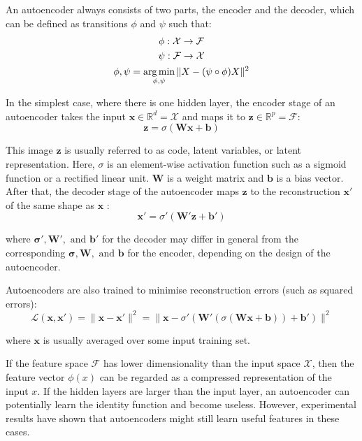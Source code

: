 \documentclass{mcmthesis}
\begin{document}
An autoencoder always consists of two parts, the encoder and the decoder, which can be defined as transitions $\phi$  and $\psi$ such that:
\begin{gather}
\phi :{\mathcal {X}}\rightarrow {\mathcal {F}} \notag\\
\psi :{\mathcal {F}}\rightarrow {\mathcal {X}} \notag\\
\phi ,\psi ={\underset {\phi ,\psi }{\operatorname {arg\,min} }}\,\|X-(\psi \circ \phi )X\|^{2}
\end{gather}

In the simplest case, where there is one hidden layer, the encoder stage of an autoencoder takes the input $\mathbf {x} \in \mathbb {R} ^{d}={\mathcal {X}}$ and maps it to $\mathbf {z} \in \mathbb {R} ^{p}={\mathcal {F}}$:
\begin{equation}
    \mathbf {z} =\sigma (\mathbf {Wx} +\mathbf {b} )
\end{equation}

This image $\mathbf {z}$  is usually referred to as code, latent variables, or latent representation. Here, $\sigma$  is an element-wise activation function such as a sigmoid function or a rectified linear unit. $\mathbf {W}$  is a weight matrix and $\mathbf {b}$  is a bias vector. After that, the decoder stage of the autoencoder maps $\mathbf {z}$  to the reconstruction $\mathbf {x'}$  of the same shape as $\mathbf {x}$ :
\begin{equation}
    \mathbf {x'} =\sigma '(\mathbf {W'z} +\mathbf {b'} )
\end{equation}


where $ \mathbf {\sigma '} ,\mathbf {W'} ,{\text{ and }}\mathbf {b'} $ for the decoder may differ in general from the corresponding $ \mathbf {\sigma } ,\mathbf {W} ,{\text{ and }}\mathbf {b} $ for the encoder, depending on the design of the autoencoder.

Autoencoders are also trained to minimise reconstruction errors (such as squared errors):
\begin{equation}
     {\mathcal {L}}(\mathbf {x} ,\mathbf {x'} )=\|\mathbf {x} -\mathbf {x'} \|^{2}=\|\mathbf {x} -\sigma '(\mathbf {W'} (\sigma (\mathbf {Wx} +\mathbf {b} ))+\mathbf {b'} )\|^{2}
\end{equation}

where $\mathbf {x}$  is usually averaged over some input training set.

If the feature space $\mathcal {F}$ has lower dimensionality than the input space $\mathcal {X}$, then the feature vector $\phi (x)$ can be regarded as a compressed representation of the input $x$. If the hidden layers are larger than the input layer, an autoencoder can potentially learn the identity function and become useless. However, experimental results have shown that autoencoders might still learn useful features in these cases.
\end{document}

